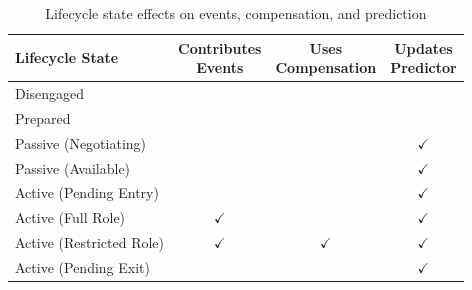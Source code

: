 \begin{table}[htp]
\small
\centering
\caption{Lifecycle state effects on events, compensation, and prediction}
\label{tab:state-behaviour}
\begin{tabular}{l c c c}
\toprule
\textbf{Lifecycle State} 
& \makecell{\textbf{Contributes} \\ \textbf{Events}} 
& \makecell{\textbf{Uses} \\ \textbf{Compensation}} 
& \makecell{\textbf{Updates} \\ \textbf{Predictor}} \\
\midrule


Disengaged &  &  &  \\
Prepared &  &  &  \\

\midrule
Passive (Negotiating) &  &  & $\checkmark$ \\
Passive (Available) &  &  & $\checkmark$ \\

\midrule
Active (Pending Entry) &  &  & $\checkmark$ \\
Active (Full Role) & $\checkmark$ &  & $\checkmark$ \\
Active (Restricted Role) & $\checkmark$ & $\checkmark$ & $\checkmark$ \\
Active (Pending Exit) &  &  & $\checkmark$ \\

\bottomrule
\end{tabular}
\end{table}